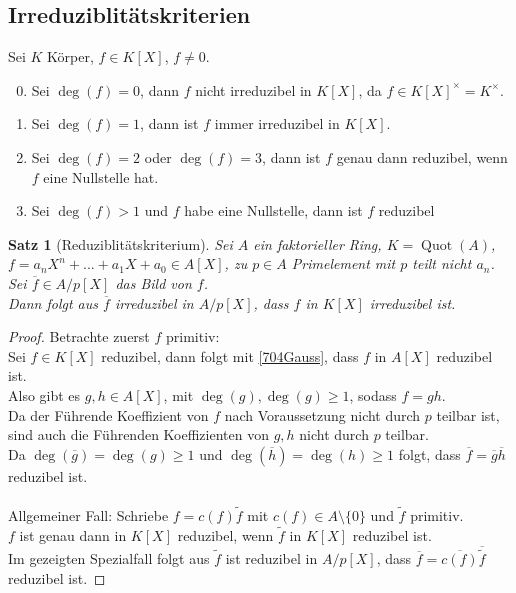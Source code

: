\documentclass[10pt,a4paper]{article}
\newcommand{\ol}[1]{\overline{#1}}
\newcommand{\Quot}{\operatorname{Quot}}
\newcounter{thm}[section]
\theoremstyle{definition}
\theoremstyle{plain}
\newtheorem{satz}[thm]{Satz}
\theoremstyle{remark}
\begin{document}
\subsection{Irreduziblitätskriterien}
Sei $K$ Körper, $f\in K[X]$, $f\neq 0$.
\begin{enumerate}
	\setcounter{enumi}{-1}
	\item Sei $\deg(f)=0$, dann $f$ nicht irreduzibel in $K[X]$, da $f\in K[X]^\times=K^\times$.
	\item Sei $\deg(f)=1$, dann ist $f$ immer irreduzibel in $K[X]$.
	\item Sei $\deg(f)=2$ oder $\deg(f)=3$, dann ist $f$ genau dann reduzibel, wenn $f$ eine Nullstelle hat.
	\item Sei $\deg(f)>1$ und $f$ habe eine Nullstelle, dann ist $f$ reduzibel
\end{enumerate}

\begin{satz}[Reduziblitätskriterium]
	Sei $A$ ein faktorieller Ring, $K=\Quot(A)$, $f=a_nX^n+...+a_1X+a_0\in A[X]$, zu $p\in A$ Primelement mit $p$ teilt nicht $a_n$.\\
	Sei $\ol f\in A/p[X]$ das Bild von $f$.\\
	Dann folgt aus $\ol f$ irreduzibel in  $A/p[X]$, dass $f$ in $K[X]$ irreduzibel ist.
\end{satz}
\begin{proof}
	Betrachte zuerst $f$ primitiv:\\
	Sei $f\in K[X]$ reduzibel, dann folgt mit \ref{704Gauss}, dass $f$ in $A[X]$ reduzibel ist.\\
	Also gibt es $g,h\in A[X]$, mit $\deg(g),\deg(g)\geq 1$, sodass $f=gh$.\\
	Da der Führende Koeffizient von $f$ nach Voraussetzung nicht durch $p$ teilbar ist, sind auch die Führenden Koeffizienten von  $g,h$ nicht durch $p$ teilbar.\\
	Da $\deg(\ol g)=\deg(g)\geq 1$ und $\deg(\ol h)=\deg(h)\geq 1$ folgt, dass $\ol f=\ol g\ol h$ reduzibel ist.\\
	\\
	Allgemeiner Fall: Schriebe $f=c(f)\tilde f$ mit $c(f)\in A\setminus\{0\}$ und $\tilde f$ primitiv.\\
	$f$ ist genau dann in $K[X]$ reduzibel, wenn $\tilde f$ in $K[X]$ reduzibel ist.\\
	Im gezeigten Spezialfall folgt aus $\tilde{ f}$ ist reduzibel in $A/p[X]$, dass $\ol f=\ol{c(f)}\ol{\tilde{f}}$ reduzibel ist.
\end{proof}
\end{document}
